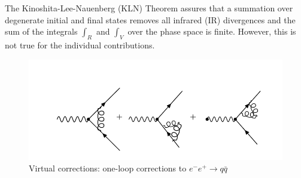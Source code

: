 The Kinoshita-Lee-Nauenberg (KLN) \cite{Grandou:1994rz} Theorem assures that a summation over degenerate initial and final states removes all infrared (IR) divergences and the sum of the integrals $ \int_R $ and $ \int_V $ over the phase space is finite. However, this is not true for the individual contributions.
\begin{figure}[h!]
\centering
\includegraphics[scale=0.5]{images/Intro/virtual.png}
\caption{Virtual corrections: one-loop corrections to $  e^- e^+ \rightarrow q\bar{q} $}
\end{figure}



